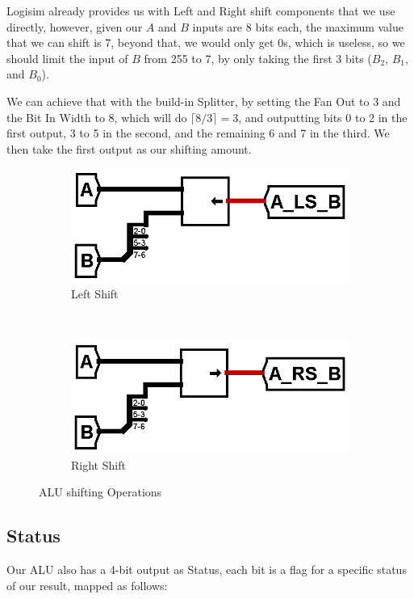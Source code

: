 \documentclass{article}
\begin{document}
Logisim already provides us with Left and Right shift components that we use directly, however, given our $A$ and $B$ inputs are 8 bits each, the maximum value that we can shift is 7, beyond that, we would only get 0s, which is useless, so we should limit the input of $B$ from 255 to 7, by only taking the first 3 bits ($B_2$, $B_1$, and $B_0$).

We can achieve that with the build-in Splitter, by setting the Fan Out to 3 and the Bit In Width to 8, which will do $\lceil 8/3 \rceil = 3 $, and outputting bits 0 to 2 in the first output, 3 to 5 in the second, and the remaining 6 and 7 in the third. We then take the first output as our shifting amount.
\\[12pt]

\begin{figure}[H]
  \centering
  \begin{subfigure}{.5\textwidth}
    \centering
    \includegraphics[width=0.8\linewidth]{circuits/leftshift.png}
    \caption{Left Shift}
  \end{subfigure}
  \\[24pt]
  \begin{subfigure}{.5\textwidth}
    \centering
    \includegraphics[width=0.8\linewidth]{circuits/rightshift.png}
    \caption{Right Shift}
  \end{subfigure}

  \caption{ALU shifting Operations}
\end{figure}


\subsection{Status}
Our ALU also has a 4-bit output as Status, each bit is a flag for a specific status of our result, mapped as follows:
\end{document}
